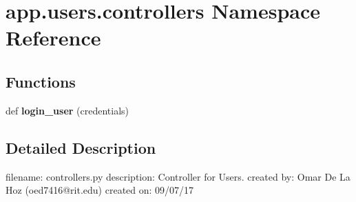 \hypertarget{namespaceapp_1_1users_1_1controllers}{}\section{app.\+users.\+controllers Namespace Reference}
\label{namespaceapp_1_1users_1_1controllers}
\subsection*{Functions}
\begin{DoxyCompactItemize}
\item 
\mbox{\label{namespaceapp_1_1users_1_1controllers_a65452c24918bbf57d6208a8146d9b685}} 
def {\bfseries login\+\_\+user} (credentials)
\end{DoxyCompactItemize}


\subsection{Detailed Description}
\begin{DoxyVerb}filename: controllers.py
description: Controller for Users.
created by: Omar De La Hoz (oed7416@rit.edu)
created on: 09/07/17
\end{DoxyVerb}
 